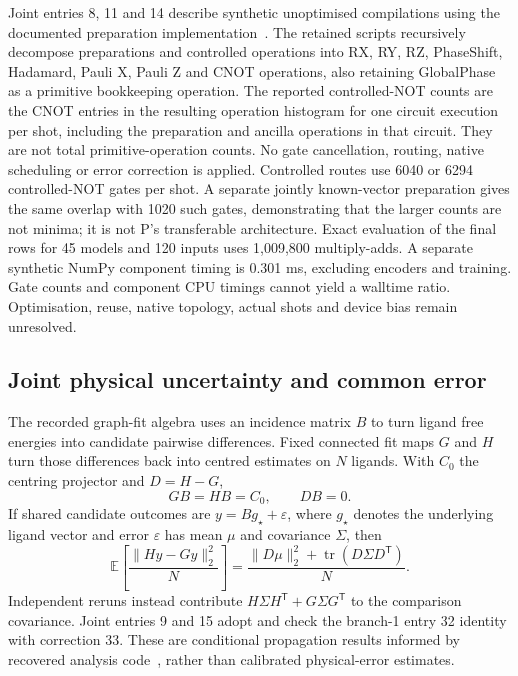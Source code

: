 \documentclass{article}
\begin{document}
Joint entries 8, 11 and 14 describe synthetic unoptimised compilations using the documented preparation implementation~\cite{preparation}. The retained scripts recursively decompose preparations and controlled operations into RX, RY, RZ, PhaseShift, Hadamard, Pauli X, Pauli Z and CNOT operations, also retaining GlobalPhase as a primitive bookkeeping operation. The reported controlled-NOT counts are the CNOT entries in the resulting operation histogram for one circuit execution per shot, including the preparation and ancilla operations in that circuit. They are not total primitive-operation counts. No gate cancellation, routing, native scheduling or error correction is applied. Controlled routes use 6040 or 6294 controlled-NOT gates per shot. A separate jointly known-vector preparation gives the same overlap with 1020 such gates, demonstrating that the larger counts are not minima; it is not P's transferable architecture. Exact evaluation of the final rows for 45 models and 120 inputs uses 1,009,800 multiply-adds. A separate synthetic NumPy component timing is 0.301 ms, excluding encoders and training. Gate counts and component CPU timings cannot yield a walltime ratio. Optimisation, reuse, native topology, actual shots and device bias remain unresolved.

\subsection{Joint physical uncertainty and common error}

The recorded graph-fit algebra uses an incidence matrix \(B\) to turn ligand free energies into candidate pairwise differences. Fixed connected fit maps \(G\) and \(H\) turn those differences back into centred estimates on \(N\) ligands. With \(C_0\) the centring projector and \(D=H-G\),
\[
GB=HB=C_0,\qquad DB=0.
\]
If shared candidate outcomes are \(y=Bg_\star+\varepsilon\), where \(g_\star\) denotes the underlying ligand vector and error \(\varepsilon\) has mean \(\mu\) and covariance \(\Sigma\), then
\[
\mathbb E\!\left[\frac{\|Hy-Gy\|_2^2}{N}\right]
=\frac{\|D\mu\|_2^2+\operatorname{tr}(D\Sigma D^{\mathsf T})}{N}.
\]
Independent reruns instead contribute \(H\Sigma H^{\mathsf T}+G\Sigma G^{\mathsf T}\) to the comparison covariance. Joint entries 9 and 15 adopt and check the branch-1 entry 32 identity with correction 33. These are conditional propagation results informed by recovered analysis code~\cite{analysis}, rather than calibrated physical-error estimates.
\end{document}
